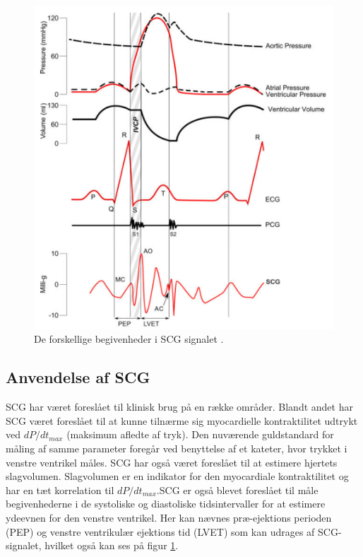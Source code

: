 \begin{figure}[H] %
\begin{center}
\includegraphics[width=1\textwidth]{figures/wigger}
\end{center}
\caption{De forskellige begivenheder i SCG signalet \cite{zanetti}.}
\label{fig:wigger}
\end{figure}


\subsection{Anvendelse af SCG}
SCG har været foreslået til klinisk brug på en række områder. Blandt andet har SCG været foreslået til at kunne tilnærme sig myocardielle kontraktilitet udtrykt ved $dP/dt_{max}$ (maksimum afledte af tryk). Den nuværende guldstandard for måling af samme parameter foregår ved benyttelse af et kateter, hvor trykket i venstre ventrikel måles. SCG har også været foreslået til at estimere hjertets slagvolumen. Slagvolumen er en indikator for den myocardiale kontraktilitet og har en tæt korrelation til $dP/dt_{max}$.SCG er også blevet foreslået til måle begivenhederne i de systoliske og diastoliske tidsintervaller for at estimere ydeevnen for den venstre ventrikel. Her kan nævnes  præ-ejektions perioden (PEP) og venstre ventrikulær ejektions tid (LVET) som kan udrages af SCG-signalet, hvilket også kan ses på figur \ref{fig:wigger}. 

